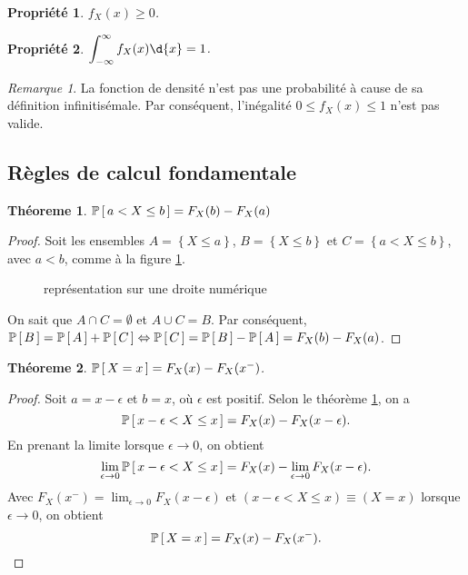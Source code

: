 \documentclass[11pt]{article}
\renewcommand\P[1]{%
	\ensuremath{%
		\mathbb{P}\left[\,#1\,\right]%
	}%
}%
\newtheorem{theoreme}{Théoreme}[section]
\newtheorem{property}{Propriété}
\theoremstyle{remark}
\newtheorem*{remark}{Remarque}
\theoremstyle{definition}
\begin{document}
\begin{property}
	$f_X(x)\geq 0$.
\end{property}

\begin{property}
	$\displaystyle\int_{-\infty}^\infty f_X(x)\d{x}=1$.
\end{property}

\begin{remark}
	La fonction de densité n'est pas une probabilité à cause de sa définition
	infinitisémale. Par conséquent, l'inégalité  $0\leq f_X(x)\leq 1$ n'est
	pas valide.
\end{remark}

\subsection{Règles de calcul fondamentale}
\begin{theoreme}\label{th:calc_fond}
	$\P{a<X\leq b}=F_X(b)-F_X(a)$
\end{theoreme}

\begin{proof}
	Soit les ensembles $A=\left\{X\leq a\right\}$, $B=\left\{X\leq b\right\}$
	et $C=\left\{a< X\leq b\right\}$, avec $a<b$, comme à la figure
	\ref{fig:droite_num}.
	\begin{figure}[H]
		\centering
		
		\caption{représentation sur une droite numérique}
		\label{fig:droite_num}
	\end{figure}
	
	On sait que $A\cap C=\emptyset$ et $A\cup C=B$. Par conséquent, 
	$\P{B}=\P{A}+\P{C}\Leftrightarrow\P{C}=\P{B}-\P{A}=F_X(b)-F_X(a)$.
\end{proof}

\begin{theoreme}
	$\P{X=x}=F_X(x)-F_X(x^-)$.
\end{theoreme}

\begin{proof}
	Soit $a=x-\epsilon$ et $b=x$, où $\epsilon$ est positif. Selon le théorème
	\ref{th:calc_fond}, on a
	\begin{equation*}
		\P{x-\epsilon<X\leq x}=F_X(x)-F_X(x-\epsilon).
	\end{equation*}
	En prenant la limite lorsque $\epsilon\rightarrow 0$, on obtient
	\begin{equation*}
		\lim_{\epsilon\rightarrow 0}\P{x-\epsilon<X\leq x}
		=F_X(x)-\lim_{\epsilon\rightarrow 0}F_X(x-\epsilon).
	\end{equation*}
	Avec $F_X(x^-)=\lim_{\epsilon\rightarrow 0}F_X(x-\epsilon)$ et
	$(x-\epsilon<X\leq x)\equiv (X=x)$ lorsque $\epsilon\rightarrow 0$, on
	obtient
	\begin{equation*}
		\P{X=x}=F_X(x)-F_X(x^-).\qedhere
	\end{equation*}
\end{proof}
\end{document}

